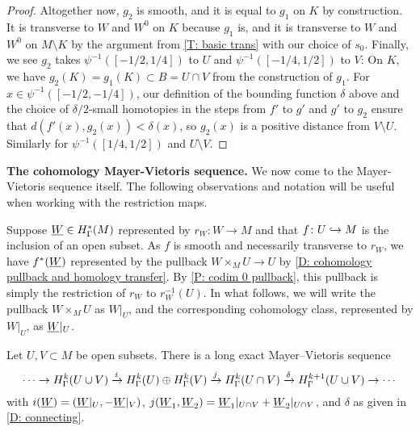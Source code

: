\begin{proof}
	Altogether now, $g_2$ is smooth, and it is equal to $g_1$ on $K$ by construction.
	It is transverse to $W$ and $W^0$ on $K$ because $g_1$ is, and it is transverse to $W$ and $W^0$ on $M \setminus K$ by the argument from \cref{T: basic trans} with our choice of $s_0$.
	Finally, we see $g_2$ takes $\psi^{-1}([-1/2,1/4])$ to $U$ and $\psi^{-1}([-1/4,1/2])$ to $V$: On $K$, we have $g_2(K) = g_1(K) \subset B = U \cap V$ from the construction of $g_1$.
	For $x\in \psi^{-1}([-1/2,-1/4])$, our definition of the bounding function $\delta$ above and the choice of $\delta/2$-small homotopies in the steps from $f'$ to $g'$ and $g'$ to $g_2$ ensure that $d(f'(x), g_2(x)) < \delta(x)$, so $g_2(x)$ is a positive distance from $V \setminus U$.
	Similarly for $\psi^{-1}([1/4,1/2])$ and $U \setminus V$.
\end{proof}



\medskip

\noindent\textbf{The cohomology Mayer-Vietoris sequence.} We now come to the Mayer-Vietoris sequence itself.
The following observations and notation will be useful when working with the restriction maps.

Suppose $\underline{W} \in H^*_\Gamma(M)$ represented by $r_W \colon W \to M$ and that $f \colon U \hookrightarrow M$ is the inclusion of an open subset.
As $f$ is smooth and necessarily transverse to $r_W$, we have $f^*(\underline{W})$ represented by the pullback $W \times_M U \to U$ by \cref{D: cohomology pullback and homology transfer}.	By \cref{P: codim 0 pullback}, this pullback is simply the restriction of $r_W$ to $r_W^{-1}(U)$.
In what follows, we will write the pullback $W \times_M U$ as $W|_U$, and the corresponding cohomology class, represented by $W|_U$, as $\underline{W}|_U$.

\begin{theorem}\label{T: absolute MV}
	Let $U,V \subset M$ be open subsets.
	There is a long exact Mayer--Vietoris sequence
	\[
	\cdots \to H^k_\Gamma(U \cup V) \xrightarrow{i} H^k_\Gamma(U) \oplus H^k_\Gamma(V) \xrightarrow{j} H^k_\Gamma(U \cap V) \xrightarrow{\delta} H^{k+1}_\Gamma(U \cup V)\to\cdots
	\]
	with $i(\underline{W}) = (\underline{W}|_U, -\underline{W}|_V)$, $j(\underline{W}_1,\underline{W}_2) = \underline{W}_1|_{U \cap V}+\underline{W}_2|_{U \cap V}$, and $\delta$ as given in \cref{D: connecting}.
\end{theorem}

